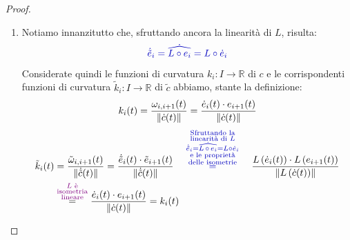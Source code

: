 \begin{proof}
\begin{enumerate}
            $L \circ e_i \colon I \to \mathbb{R}^n \quad \forall t \in I \quad \{L(e_1(t)), \, \dots, \, L(e_n(t))\}$ è base ortonormale di $\mathbb{R}^n$ positiva  
            per la proposizione \ref{prop:isometrie_dirette_preservano_orientazione} \textcolor{orange}{perché $F$ è una isometria diretta}.
            \[ L \left( \langle \dot{c}(t), \, \dots, \, c^{(k)}(t) \rangle \right) \overset{\eqref{eq:dimostrazione_funzioni_di_curvatura_invarianti_metrici_1}}{=} \langle \dot{\tilde{c}}(t), \, \dots, \, \tilde{c}^{(k)}(t) \rangle \] 
            $\Rightarrow \left\{L(e_1(t)), \, \dots, \, L(e_k(t)) \right\}$ base di 
            $\langle \dot{\tilde{c}}(t), \, \dots, \, \tilde{c}^{(k)}(t) \rangle$ è una base concorde con
            
            la base $\left( \dot{\tilde{c}}(t), \, \dots, \, \tilde{c}^{(k)}(t) \right)$ quindi
            possiamo concludere che il riferimento canonico di Frenet $\left(\tilde{e}_i\right)_{1 \leq i \leq n}$ di $\tilde{c}$ è costituito dalla
            famiglia di funzioni $L \circ e_i$ per $i = 1, \dots, n$.
            \item Notiamo innanzitutto che, sfruttando ancora la linearità di $L$, risulta:
            \[ \color{blu} \dot{\tilde{e}}_i = \dot{\widehat{L \circ e_i}} = L \circ \dot{e}_i \]
            Considerate quindi le funzioni di curvatura $k_i \colon I \to \mathbb{R}$ di $c$ e le corrispondenti funzioni di curvatura $\tilde{k}_i \colon I \to \mathbb{R}$ di $\tilde{c}$ 
            abbiamo, stante la definizione:
            \[ k_i(t) = \frac{ \omega_{i,i+1}(t) }{ \, \lVert\dot{c}(t)\rVert \,} = \frac{ \dot{e}_i(t) \cdot e_{i+1}(t) }{ \, \lVert\dot{c}(t)\rVert \,}  \]
            \begin{align*}
            \tilde{k}_i(t) &= \frac{ \tilde{\omega}_{i,i+1}(t) }{ \, \norm{\dot{\tilde{c}}(t)} \,} = \frac{ \dot{\tilde{e}}_i(t) \cdot \tilde{e}_{i+1}(t) }{ \, \norm{\dot{\tilde{c}}(t)} \,} \overset{ \color{blu} \substack{  \text{Sfruttando la} \\   \text{linearità di } L   \\ \quad \dot{\tilde{e}}_i = \dot{\widehat{L \, \circ \, e_i}} = L \circ \dot{e}_i  \quad \\ \text{e le proprietà} \\ \text{delle isometrie} }}{=} \frac{ L\left( \dot{e}_i(t) \right) \cdot L \left( e_{i+1}(t) \right) }{ \, \norm{L \left( \dot{c} (t)\right)}  \,} \\
            &\overset{\textcolor{violet}{\substack{L \text{ è} \\ \text{isometria} \\  \text{lineare}}}}{=} \frac{ \dot{e}_i(t) \cdot e_{i+1}(t) }{ \, \norm{\dot{c}(t)} \,} = k_i(t)
            \end{align*}
        \end{enumerate}
        \end{proof}
